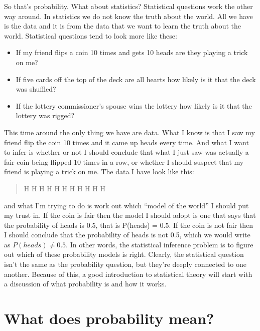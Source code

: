 \documentclass[
  a4paper,
]{book}
\providecommand{\tightlist}{%
  \setlength{\itemsep}{0pt}\setlength{\parskip}{0pt}}\usepackage{longtable,booktabs,array}
\begin{document}
So that's probability. What about statistics? Statistical questions work
the other way around. In statistics we do not know the truth about the
world. All we have is the data and it is from the data that we want to
learn the truth about the world. Statistical questions tend to look more
like these:

\begin{itemize}
\tightlist
\item
  If my friend flips a coin 10 times and gets 10 heads are they playing
  a trick on me?
\item
  If five cards off the top of the deck are all hearts how likely is it
  that the deck was shuffled?
\item
  If the lottery commissioner's spouse wins the lottery how likely is it
  that the lottery was rigged?
\end{itemize}

This time around the only thing we have are data. What I know is that I
saw my friend flip the coin 10 times and it came up heads every time.
And what I want to infer is whether or not I should conclude that what I
just saw was actually a fair coin being flipped 10 times in a row, or
whether I should suspect that my friend is playing a trick on me. The
data I have look like this:

\begin{quote}
H H H H H H H H H H H
\end{quote}

and what I'm trying to do is work out which ``model of the world'' I
should put my trust in. If the coin is fair then the model I should
adopt is one that says that the probability of heads is 0.5, that is
P(heads) = 0.5. If the coin is not fair then I should conclude that the
probability of heads is not 0.5, which we would write as
\(P(heads)\ne{0.5}\). In other words, the statistical inference problem
is to figure out which of these probability models is right. Clearly,
the statistical question isn't the same as the probability question, but
they're deeply connected to one another. Because of this, a good
introduction to statistical theory will start with a discussion of what
probability is and how it works.

\hypertarget{what-does-probability-mean}{%
\section{What does probability mean?}\label{what-does-probability-mean}}
\end{document}
